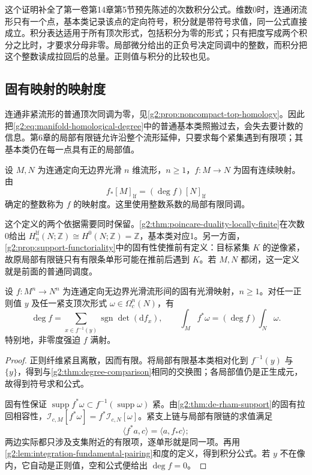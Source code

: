这个证明补全了第一卷第14章第5节预先陈述的次数积分公式。维数0时，连通闭流形只有一个点，基本类记录该点的定向符号，积分就是带符号求值，同一公式直接成立。积分表达适用于所有顶次形式，包括积分为零的形式；只有把度写成两个积分之比时，才要求分母非零。局部微分给出的正负号决定同调中的整数，而积分把这个整数读成拉回后的总量。正则值与积分的比较也见\cite[第457--459页，定理17.35及命题17.36]{Lee2012Smooth}。

\subsection{固有映射的映射度}
\label{g2:subsec:1601:03}

连通非紧流形的普通顶次同调为零，见\cref{g2:prop:noncompact-top-homology}。因此把\eqref{g2:eq:manifold-homological-degree}中的普通基本类照搬过去，会失去要计数的信息。第6章的局部有限链允许沿整个流形延伸，只要求每个紧集遇到有限项；其基本类仍在每一点具有正的局部值。

\begin{definition}\label{g2:def:proper-manifold-degree}
	设 \(M,N\) 为连通定向无边界光滑 \(n\) 维流形，\(n\ge1\)，\(f:M\to N\) 为固有连续映射。由
	\[
		f_*[M]_{\mathrm{lf}}=(\deg f)[N]_{\mathrm{lf}}
	\]
	确定的整数称为 \(f\) 的映射度。这里使用整数系数的局部有限同调。
\end{definition}

这个定义的两个依据需要同时保留。\cref{g2:thm:poincare-duality-locally-finite}在次数0给出 \(H_n^{\mathrm{lf}}(N;\mathbb Z)\cong H^0(N;\mathbb Z)=\mathbb Z\)，基本类对应1。另一方面，\cref{g2:prop:support-functoriality}中的固有性使推前有定义：目标紧集 \(K\) 的逆像紧，故原局部有限链只有有限条单形可能在推前后遇到 \(K\)。若 \(M,N\) 都闭，这一定义就是前面的普通同调度。

\begin{theorem}\label{g2:thm:proper-degree-formulas}
	设 \(f:M^n\to N^n\) 为连通定向无边界光滑流形间的固有光滑映射，\(n\ge1\)。对任一正则值 \(y\) 及任一紧支顶次形式 \(\omega\in\Omega_c^n(N)\)，有
	\[
		\deg f=\sum_{x\in f^{-1}(y)}\operatorname{sgn}\det(\mathrm{d}f_x),
		\qquad \int_Mf^*\omega=(\deg f)\int_N\omega.
	\]
	特别地，非零度强迫 \(f\) 满射。
\end{theorem}
\begin{proof}
	正则纤维紧且离散，因而有限。将局部有限基本类相对化到 \(f^{-1}(y)\) 与 \(\{y\}\)，得到与\cref{g2:thm:degree-comparison}相同的交换图；各局部值仍是正生成元，故得到符号求和公式。

	固有性保证 \(\operatorname{supp}f^*\omega\subset f^{-1}(\operatorname{supp}\omega)\) 紧。由\cref{g2:thm:de-rham-support}的固有拉回相容性，\(\mathcal I_{c,M}[f^*\omega]=f^*\mathcal I_{c,N}[\omega]\)。紧支上链与局部有限链的求值满足
	\[
		\langle f^*a,c\rangle=\langle a,f_*c\rangle;
	\]
	两边实际都只涉及支集附近的有限项，逐单形就是同一项。再用\cref{g2:lem:integration-fundamental-pairing}和度的定义，得到积分公式。若 \(y\) 不在像内，它自动是正则值，空和公式便给出 \(\deg f=0\)。
\end{proof}

